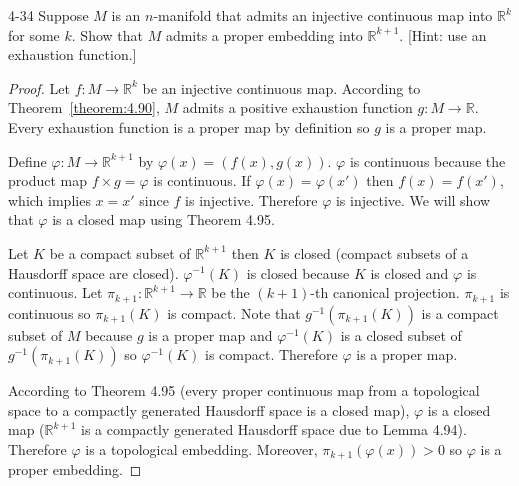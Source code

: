 \begin{problem}{4-34}
Suppose $M$ is an $n$-manifold that admits an injective continuous map into $\mathbb{R}^{k}$ for some $k$. Show that $M$ admits a proper embedding into $\mathbb{R}^{k+1}$. [Hint: use an exhaustion function.]
\end{problem}

\begin{proof}
	Let $f: M\to \mathbb{R}^{k}$ be an injective continuous map. According to Theorem~\ref{theorem:4.90}, $M$ admits a positive exhaustion function $g: M \to \mathbb{R}$. Every exhaustion function is a proper map by definition so $g$ is a proper map.

	Define $\varphi: M \to \mathbb{R}^{k+1}$ by $\varphi(x) = (f(x), g(x))$. $\varphi$ is continuous because the product map $f\times g = \varphi$ is continuous. If $\varphi(x) = \varphi(x')$ then $f(x) = f(x')$, which implies $x = x'$ since $f$ is injective. Therefore $\varphi$ is injective. We will show that $\varphi$ is a closed map using Theorem 4.95.

	Let $K$ be a compact subset of $\mathbb{R}^{k+1}$ then $K$ is closed (compact subsets of a Hausdorff space are closed). $\varphi^{-1}(K)$ is closed because $K$ is closed and $\varphi$ is continuous. Let $\pi_{k+1}: \mathbb{R}^{k+1} \to \mathbb{R}$ be the $(k+1)$-th canonical projection. $\pi_{k+1}$ is continuous so $\pi_{k+1}(K)$ is compact. Note that $g^{-1}(\pi_{k+1}(K))$ is a compact subset of $M$ because $g$ is a proper map and $\varphi^{-1}(K)$ is a closed subset of $g^{-1}(\pi_{k+1}(K))$ so $\varphi^{-1}(K)$ is compact. Therefore $\varphi$ is a proper map.

	According to Theorem 4.95 (every proper continuous map from a topological space to a compactly generated Hausdorff space is a closed map), $\varphi$ is a closed map ($\mathbb{R}^{k+1}$ is a compactly generated Hausdorff space due to Lemma 4.94). Therefore $\varphi$ is a topological embedding. Moreover, $\pi_{k+1}(\varphi(x)) > 0$ so $\varphi$ is a proper embedding.
\end{proof}
